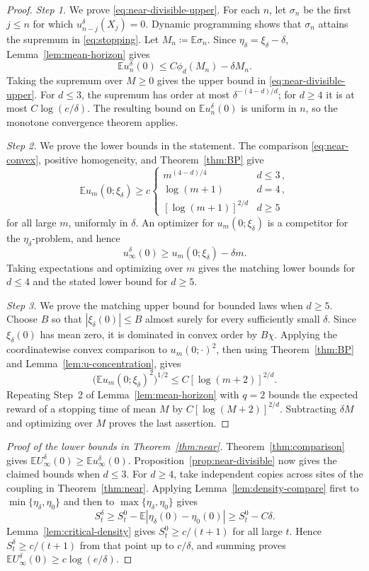 \documentclass[11pt]{amsart}
\theoremstyle{plain}
\theoremstyle{definition}
\newcommand{\E}{\mathbb{E}}
\begin{document}
\begin{proof}
	\smallskip
	\noindent\emph{Step 1.} We prove \eqref{eq:near-divisible-upper}.
	For each $n$, let $\sigma_n$ be the first $j\leq n$ for which $u_{n-j}^\delta(X_j)=0$. Dynamic programming shows that $\sigma_n$ attains the
	supremum in \eqref{eq:stopping}. Let $M_n\coloneqq\E\sigma_n$. Since
	$\eta_\delta=\xi_\delta-\delta$, Lemma~\ref{lem:mean-horizon} gives
	\[
		\E u_n^\delta(0)\leq C\phi_d(M_n)-\delta M_n.
	\]
	Taking the supremum over $M\geq0$ gives the upper bound in
	\eqref{eq:near-divisible-upper}. For $d\leq3$, the supremum has order at most
	$\delta^{-(4-d)/d}$; for $d\geq4$ it is at most
	$C\log(e/\delta)$. The resulting bound on $\E u_n^\delta(0)$ is uniform in $n$, so the monotone convergence theorem applies.

	\smallskip
	\noindent\emph{Step 2.} We prove the lower bounds in the statement.
	The comparison \eqref{eq:near-convex}, positive homogeneity, and
	Theorem~\ref{thm:BP} give
	\[
		\E u_m(0;\xi_\delta)\geq c
		\begin{cases}
			m^{(4-d)/4}&d\leq3\,,\\
			\log(m+1)&d=4\,,\\
			[\log(m+1)]^{2/d}&d\geq5
		\end{cases}
	\]
	for all large $m$, uniformly in $\delta$. An optimizer for
	$u_m(0;\xi_\delta)$ is a competitor for the $\eta_\delta$-problem, and hence
	\[
		u_\infty^\delta(0)\geq u_m(0;\xi_\delta)-\delta m.
	\]
	Taking expectations and optimizing over $m$ gives the matching lower bounds
	for $d\leq4$ and the stated lower bound for $d\geq5$.

	\smallskip
	\noindent\emph{Step 3.} We prove the matching upper bound for bounded laws
	when $d\geq5$. Choose $B$ so that $|\xi_\delta(0)|\leq B$ almost surely for every sufficiently small $\delta$. Since $\xi_\delta(0)$ has mean zero, it is
	dominated in convex order by $B\chi$. Applying the coordinatewise
	convex comparison to $u_m(0;\cdot)^2$, then using Theorem~\ref{thm:BP} and Lemma~\ref{lem:u-concentration}, gives
	\[
		\bigl(\E u_m(0;\xi_\delta)^2\bigr)^{1/2}
		\leq C[\log(m+2)]^{2/d}.
	\]
	Repeating Step~2 of Lemma~\ref{lem:mean-horizon} with $q=2$ bounds the
	expected reward of a stopping time of mean $M$ by
	$C[\log(M+2)]^{2/d}$. Subtracting $\delta M$ and optimizing over $M$
	proves the last assertion.
\end{proof}

\begin{proof}[Proof of the lower bounds in Theorem~\ref{thm:near}]
	Theorem~\ref{thm:comparison} gives $\E U_\infty^\delta(0)\geq\E u_\infty^\delta(0)$.
	Proposition~\ref{prop:near-divisible} now gives the claimed bounds when
	$d\leq3$. For $d\geq4$, take independent copies across
	sites of the coupling in Theorem~\ref{thm:near}. Applying
	Lemma~\ref{lem:density-compare} first to
	$\min\{\eta_\delta,\eta_0\}$ and then to
	$\max\{\eta_\delta,\eta_0\}$ gives
	\[
		S_t^\delta\geq S_t^0-\E|\eta_\delta(0)-\eta_0(0)|
		\geq S_t^0-C\delta.
	\]
	Lemma~\ref{lem:critical-density} gives $S_t^0\geq c/(t+1)$ for all large
	$t$. Hence $S_t^\delta\geq c/(t+1)$ from that point up to $c/\delta$,
	and summing proves $\E U_\infty^\delta(0)\geq c\log(e/\delta)$.
\end{proof}
\end{document}
